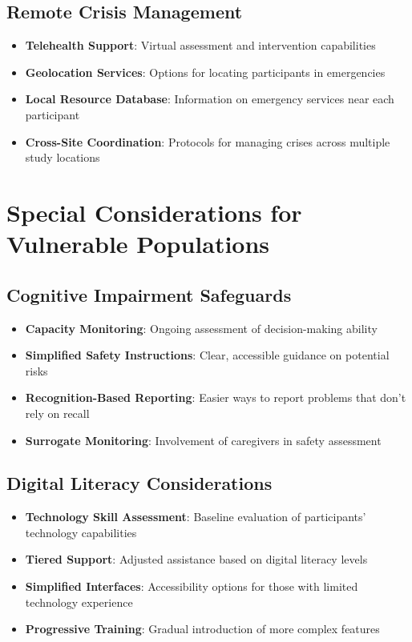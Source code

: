 \subsection{Remote Crisis Management}
\begin{itemize}
    \item \textbf{Telehealth Support}: Virtual assessment and intervention capabilities
    
    \item \textbf{Geolocation Services}: Options for locating participants in emergencies
    
    \item \textbf{Local Resource Database}: Information on emergency services near each participant
    
    \item \textbf{Cross-Site Coordination}: Protocols for managing crises across multiple study locations
\end{itemize}

\section{Special Considerations for Vulnerable Populations}
\subsection{Cognitive Impairment Safeguards}
\begin{itemize}
    \item \textbf{Capacity Monitoring}: Ongoing assessment of decision-making ability
    
    \item \textbf{Simplified Safety Instructions}: Clear, accessible guidance on potential risks
    
    \item \textbf{Recognition-Based Reporting}: Easier ways to report problems that don't rely on recall
    
    \item \textbf{Surrogate Monitoring}: Involvement of caregivers in safety assessment
\end{itemize}

\subsection{Digital Literacy Considerations}
\begin{itemize}
    \item \textbf{Technology Skill Assessment}: Baseline evaluation of participants' technology capabilities
    
    \item \textbf{Tiered Support}: Adjusted assistance based on digital literacy levels
    
    \item \textbf{Simplified Interfaces}: Accessibility options for those with limited technology experience
    
    \item \textbf{Progressive Training}: Gradual introduction of more complex features
\end{itemize}

